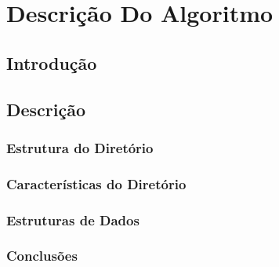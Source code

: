 \chapter{Descrição Do Algoritmo}
\label{chap:descricao}

\section{Introdução}
\label{descricao:sec:intro}

\section{Descrição}

\subsection{Estrutura do Diretório}

\subsection{Características do Diretório}

\subsection{Estruturas de Dados}


\subsection{Conclusões}
